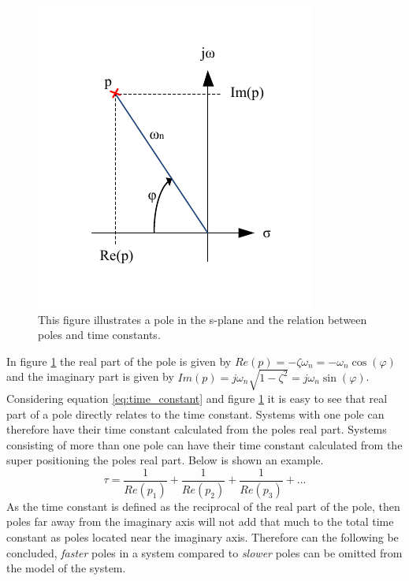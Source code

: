 \begin{figure}[htb]
	\begin{center}
	\includegraphics[scale=1,trim=0 0 0 0]{graphics/splane.pdf} %
	\caption{This figure illustrates a pole in the s-plane and the relation between poles and time constants.}
	\label{fig:s_plane}			%
	\end{center}
\end{figure}
In figure \ref{fig:s_plane} the real part of the pole is given by $Re(p) = - \zeta\omega_{n} = - \omega_{n} \cos(\varphi)$ and the imaginary part is given by $Im(p) = j\omega_{n}\sqrt{1 - \zeta^{2}} = j\omega_{n}\sin(\varphi)$. Considering equation \ref{eq:time_constant} and figure \ref{fig:s_plane} it is easy to see that real part of a pole directly relates to the time constant. Systems with one pole can therefore have their time constant calculated from the poles real part. Systems consisting of more than one pole can have their time constant calculated from the super positioning the poles real part. Below is shown an example.
\begin{equation}
	\tau = \frac{1}{Re(p_{1})} + \frac{1}{Re(p_{2})} + \frac{1}{Re(p_{3})} + ...\label{eq:time_constant}
\end{equation}
As the time constant is defined as the reciprocal of the real part of the pole, then poles far away from the imaginary axis will not add that much to the total time constant as poles located near the imaginary axis. Therefore can the following be concluded, \textit{faster} poles in a system compared to \textit{slower} poles can be omitted from the model of the system.

